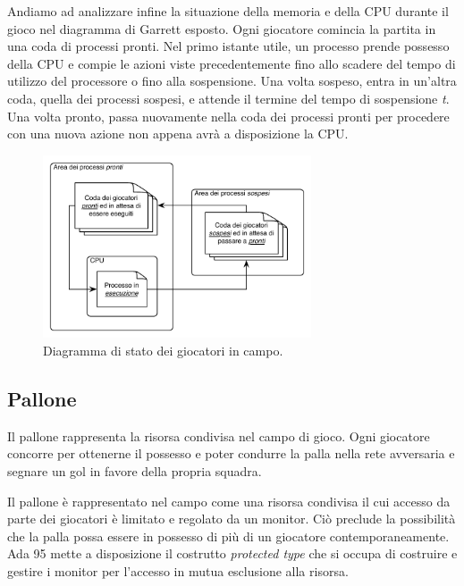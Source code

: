 \documentclass[aps,letterpaper,10pt]{article}
\begin{document}
Andiamo ad analizzare infine la situazione della memoria e della CPU durante il gioco nel diagramma di Garrett esposto. Ogni giocatore comincia la partita in una coda di processi pronti. Nel primo istante utile, un processo prende possesso della CPU e compie le azioni viste precedentemente fino allo scadere del tempo di utilizzo del processore o fino alla sospensione. Una volta sospeso, entra in un'altra coda, quella dei processi sospesi, e attende il termine del tempo di sospensione \emph{t}. Una volta pronto, passa nuovamente nella coda dei processi pronti per procedere con una nuova azione non appena avr\`a a disposizione la CPU.

\begin{figure}[H]
	\begin{center}
		\includegraphics[width=300px]{images/player-schema.pdf}
	\end{center}
\caption{Diagramma di stato dei giocatori in campo.}
\end{figure}

\subsection{Pallone}
\label{pallone}

Il pallone rappresenta la risorsa condivisa nel campo di gioco. Ogni giocatore concorre per ottenerne il possesso e poter condurre la palla nella rete avversaria e segnare un gol in favore della propria squadra. \vspace{3mm}

Il pallone \`e rappresentato nel campo come una risorsa condivisa il cui accesso da parte dei giocatori \`e limitato e regolato da un monitor. Ci\`o preclude la possibilit\`a che la palla possa essere in possesso di pi\`u di un giocatore contemporaneamente. Ada 95 mette a disposizione il costrutto \emph{protected type} che si occupa di costruire e gestire i monitor per l'accesso in mutua esclusione alla risorsa. \vspace{3mm}
\end{document}
